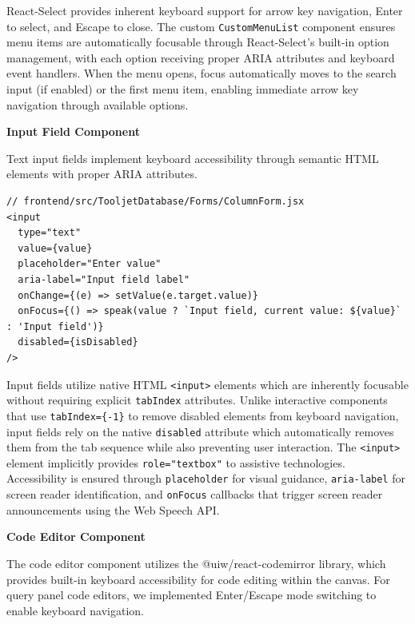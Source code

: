 React-Select provides inherent keyboard support for arrow key navigation, Enter to select, and Escape to close. The custom \texttt{CustomMenuList} component ensures menu items are automatically focusable through React-Select's built-in option management, with each option receiving proper ARIA attributes and keyboard event handlers. When the menu opens, focus automatically moves to the search input (if enabled) or the first menu item, enabling immediate arrow key navigation through available options.

\textbf{Input Field Component}

Text input fields implement keyboard accessibility through semantic HTML elements with proper ARIA attributes.

\begin{lstlisting}[caption=Input Field Accessibility, label=lst:input-focus]
// frontend/src/TooljetDatabase/Forms/ColumnForm.jsx
<input
  type="text"
  value={value}
  placeholder="Enter value"
  aria-label="Input field label"
  onChange={(e) => setValue(e.target.value)}
  onFocus={() => speak(value ? `Input field, current value: ${value}` : 'Input field')}
  disabled={isDisabled}
/>
\end{lstlisting}

Input fields utilize native HTML \texttt{<input>} elements which are inherently focusable without requiring explicit \texttt{tabIndex} attributes. Unlike interactive components that use \texttt{tabIndex=\{-1\}} to remove disabled elements from keyboard navigation, input fields rely on the native \texttt{disabled} attribute which automatically removes them from the tab sequence while also preventing user interaction. The \texttt{<input>} element implicitly provides \texttt{role="textbox"} to assistive technologies. Accessibility is ensured through \texttt{placeholder} for visual guidance, \texttt{aria-label} for screen reader identification, and \texttt{onFocus} callbacks that trigger screen reader announcements using the Web Speech API.

\textbf{Code Editor Component}

The code editor component utilizes the @uiw/react-codemirror library, which provides built-in keyboard accessibility for code editing within the canvas. For query panel code editors, we implemented Enter/Escape mode switching to enable keyboard navigation.

